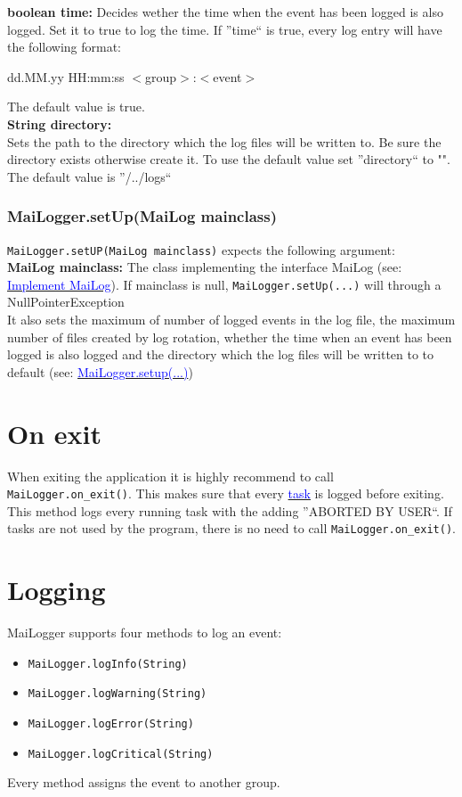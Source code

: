 \documentclass{article}
\newcommand{\refh}[2]{\hyperref[#1] {\textcolor{blue}{#2}}}
\begin{document}
    \textbf{boolean time:}
    Decides wether the time when the event has been logged is also logged.
    Set it to true to log the time.
    If ''time`` is true, every log entry will have the following format:
    \begin{description}
        \item dd.MM.yy HH:mm:ss $<$group$>$:$<$event$>$
    \end{description}
    The default value is true. \\

    \textbf{String directory:} \\
    Sets the path to the directory which the log files will be written to.
    Be sure the directory exists otherwise create it.
    To use the default value set ''directory`` to "".
    The default value is ''/../logs`` \\

    \subsubsection{MaiLogger.setUp(MaiLog mainclass)}
    \label{setup_mailogger.setup_2}
    \lstinline|MaiLogger.setUP(MaiLog mainclass)| expects the following argument: \\

    \textbf{MaiLog mainclass:}
    The class implementing the interface MaiLog (see: \refh{setup_interface}{Implement MaiLog}).
    If mainclass is null, \lstinline|MaiLogger.setUp(...)| will through a NullPointerException \\

    It also sets the maximum of number of logged events in the log file, the maximum number of files created by log rotation, whether the time when an event has been logged is also logged and the directory which the log files will be written to to default (see: \refh{setup_mailogger.setup_1}{MaiLogger.setup(...)})

\section{On exit}
\label{on_exit}
    When exiting the application it is highly recommend to call \lstinline|MaiLogger.on_exit()|.
    This makes sure that every \refh{tasks}{task} is logged before exiting.
    This method logs every running task with the adding ''ABORTED BY USER``.
    If tasks are not used by the program, there is no need to call \lstinline|MaiLogger.on_exit()|.

\section{Logging}
MaiLogger supports four methods to log an event:
\begin{itemize}
    \item \lstinline|MaiLogger.logInfo(String)|
    \item \lstinline|MaiLogger.logWarning(String)|
    \item \lstinline|MaiLogger.logError(String)|
    \item \lstinline|MaiLogger.logCritical(String)|
\end{itemize}
Every method assigns the event to another group.
\end{document}
